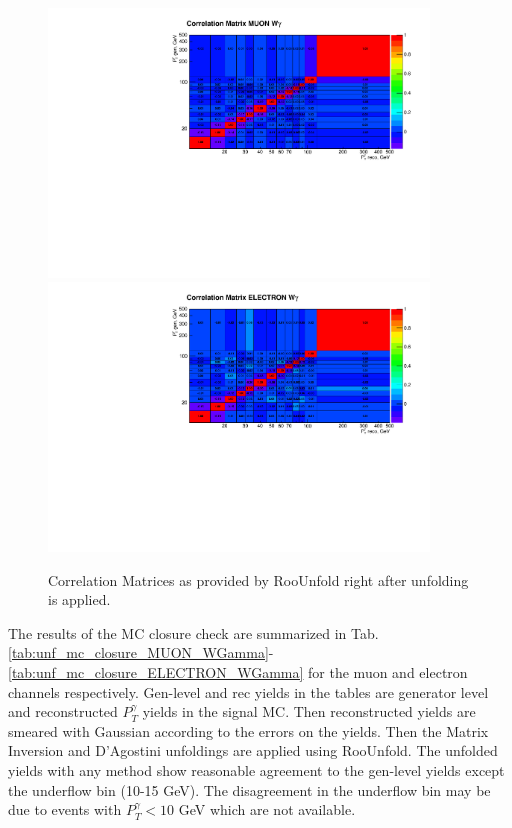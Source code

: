 \begin{figure}[htb]
  \begin{center}
   \includegraphics[width=0.90\textwidth]{../figs/figs_v11/MUON_WGamma/Constants/matrCorrelation_yield_pm_stat.pdf}\\
\includegraphics[width=0.90\textwidth]{../figs/figs_v11/ELECTRON_WGamma/Constants/matrCorrelation_yield_pm_stat.pdf}
  \caption{Correlation Matrices as provided by RooUnfold right after unfolding is applied.}
  \label{fig:corrMatrices_Wg}
  \end{center}
\end{figure}


The results of the MC closure check are summarized in Tab. \ref{tab:unf_mc_closure_MUON_WGamma}-\ref{tab:unf_mc_closure_ELECTRON_WGamma} for the muon and electron channels respectively. Gen-level and rec yields in the tables are generator level and reconstructed $P_T^{\gamma}$ yields in the signal MC. Then reconstructed yields are smeared with Gaussian according to the errors on the yields. Then the Matrix Inversion and D'Agostini unfoldings are applied using RooUnfold. The unfolded yields with any method show reasonable agreement to the gen-level yields except the underflow bin (10-15 GeV). The disagreement in the underflow bin may be due to events with $P_T^{\gamma}<10$ GeV which are not available.  

